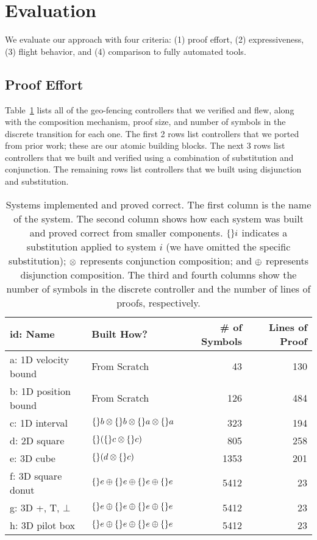 \section{Evaluation}
\label{sec:eval}
We evaluate our approach with four criteria: (1) proof effort, (2)
expressiveness, (3) flight behavior, and (4) comparison to fully automated
tools.

\subsection{Proof Effort}
Table~\ref{fig:monitors} lists all of the geo-fencing controllers that we
verified and flew, along with the composition mechanism, proof size, and
number of symbols in the discrete transition for each one.  The first 2
rows list controllers that we ported from prior work; these are our atomic
building blocks.  The next 3 rows list controllers that we built and
verified using a combination of substitution and conjunction.  The
remaining rows list controllers that we built using disjunction and
substitution.

\begin{table}
\begin{tabular}{l|l|r|r}
id: Name & Built How? & \# of Symbols & Lines of Proof \\
\hline 
a: 1D velocity bound & From Scratch & 43 & 130 \\
b: 1D position bound & From Scratch & 126 & 484 \\
c: 1D interval & $\{\}b \otimes \{\}b \otimes \{\}a \otimes \{\}a$ & 323 & 194 \\
d: 2D square & $\{\}(\{\}c \otimes \{\}c)$ & 805 & 258 \\
e: 3D cube & $\{\}(d \otimes \{\}c)$ & 1353 & 201 \\
f: 3D square donut & $\{\}e\oplus\{\}e\oplus\{\}e\oplus\{\}e$ & 5412 & 23 \\
g: 3D +, T, $\bot$ & $\{\}e\oplus\{\}e\oplus\{\}e\oplus\{\}e$ & 5412 & 23 \\
h: 3D pilot box & $\{\}e\oplus\{\}e\oplus\{\}e\oplus\{\}e$ & 5412 & 23 \\
\end{tabular}
\caption{Systems implemented and proved correct. The first column is the name of the system. The second column shows how each system was built and proved correct from smaller components. $\{\}i$ indicates a substitution applied to system $i$ (we have omitted the specific substitution); $\otimes$ represents conjunction composition; and $\oplus$ represents disjunction composition. The third and fourth columns show the number of symbols in the discrete controller and the number of lines of proofs, respectively.}
\label{fig:monitors}
\end{table}

